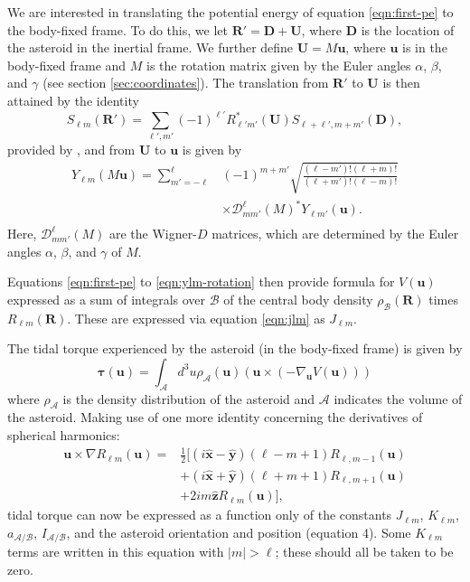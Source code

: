 \documentclass[9pt,twocolumn]{article}
\newcommand{\unit}[1]{\bm{\hat{#1}}}
\numberwithin{equation}{section}
\begin{document}
We are interested in translating the potential energy of equation \ref{eqn:first-pe} to the body-fixed frame. To do this, we let $\bm{R'} = \bm D + \bm U$, where $\bm D$ is the location of the asteroid in the inertial frame. We further define $\bm U = M\bm u$, where $\bm u$ is in the body-fixed frame and $M$ is the rotation matrix given by the Euler angles $\alpha$, $\beta$, and $\gamma$ (see section \ref{sec:coordinates}). The translation from $\bm {R'}$ to $\bm U$ is then attained by the identity 
\begin{equation}
  S_{\ell m}(\bm R') = \sum_{\ell', m'} (-1)^{\ell'}R^*_{\ell' m'}(\bm U)S_{\ell+\ell', m + m'} (\bm D),
  \label{eqn:ylm-translation}
\end{equation}  
provided by \cite{Gelderen1998TheSO}, and from $\bm U$ to $\bm u$ is given by
\begin{equation}
  \begin{split}
    Y_{\ell m}(M\bm u) = \sum_{m'=-\ell}^\ell & (-1)^{m+m'}\sqrt{\frac{(\ell-m')!(\ell+m)!}{(\ell+m')!(\ell-m)!}} \\
    & \times \mathcal{D}^\ell_{mm'}(M)^* Y_{\ell m'}(\bm u).\\
  \end{split}
  \label{eqn:ylm-rotation}
\end{equation}
Here, $\mathcal{D}^\ell_{mm'}(M)$ are the Wigner-$D$ matrices, which are determined by the Euler angles $\alpha$, $\beta$, and $\gamma$ of $M$.

Equations \ref{eqn:first-pe} to \ref{eqn:ylm-rotation} then provide formula for $V(\bm u)$ expressed as a sum of integrals over $\mathcal{B}$ of the central body density $\rho_\mathcal{B}(\bm R)$ times $R_{\ell m}(\bm R)$. These are expressed via equation \ref{eqn:jlm} as $J_{\ell m}$.

The tidal torque experienced by the asteroid (in the body-fixed frame) is given by
\begin{equation}
  \bm{\tau}(\bm u) = \int_\mathcal{A} d^3 u \rho_\mathcal{A}(\bm u) (\bm u \times (-\nabla_{\bm u} V(\bm u)))
\end{equation}
where $\rho_\mathcal{A}$ is the density distribution of the asteroid and $\mathcal{A}$ indicates the volume of the asteroid. Making use of one more identity concerning the derivatives of spherical harmonics:
\begin{equation}
  \begin{split}
  \bm u \times \nabla R_{\ell m}(\bm u)=&\frac{1}{2}\Big[(i\unit x - \unit y)(\ell-m+1)R_{\ell,m-1}(\bm u)\\
  &+(i\unit x+\unit y)(\ell+m+1)R_{\ell,m+1}(\bm u)\\
  & +2im\unit z R_{\ell m}(\bm u)\Big],
  \end{split}
\end{equation}
tidal torque can now be expressed as a function only of the constants $J_{\ell m}$, $K_{\ell m}$, $a_\mathcal{A/B}$, $I_\mathcal{A/B}$, and the asteroid orientation and position (equation 4). Some $K_{\ell m}$ terms are written in this equation with $|m|>\ell$; these should all be taken to be zero.
\end{document}
